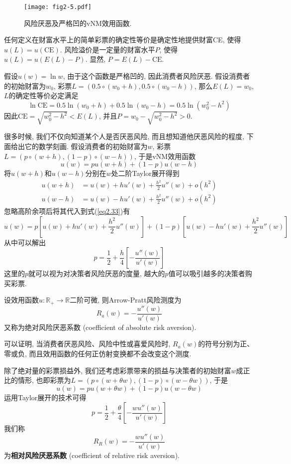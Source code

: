 \documentclass[cn, 12pt, math=mtpro2, bibstyle=apa, blue]{elegantbook}
\newcommand{\R}{\mathbb{R}}
\begin{document}
\begin{figure}[htbp!]
  \centering
  \texttt{[image: fig2-5.pdf]}
  \caption{风险厌恶及严格凹的vNM效用函数.}\label{fig2.5}
\end{figure}

\begin{definition}[确定性等价与风险溢价]
任何定义在财富水平上的简单彩票的确定性等价是确定性地提供财富CE, 使得$u(L)=u(\text{CE})$. 风险溢价是一定量的财富水平$P$, 使得$u(L)=u(E(L)-P)$. 显然, $P=E(L)-\text{CE}$.
\end{definition}

\begin{example}
假设$u(w)=\ln w$, 由于这个函数是严格凹的, 因此消费者风险厌恶. 假设消费者的初始财富为$w_0$, 彩票$L=(0.5\circ (w_0+h), 0.5\circ (w_0-h))$, 那么$E(L)=w_0$, $L$的确定性等价必定满足
$$\ln \text{CE}=0.5\ln (w_0+h)+0.5\ln (w_0-h)=0.5\ln (w_0^2-h^2)$$
因此$\text{CE}=\sqrt{w_0^2-h^2}<E(L)$, 并且$P=w_0-\sqrt{w_0^2-h^2}>0$.
\end{example}

很多时候, 我们不仅向知道某个人是否厌恶风险, 而且想知道他厌恶风险的程度, 下面给出它的数学刻画. 假设消费者的初始财富为$w$, 彩票$L=(p\circ (w+h), (1-p)\circ (w-h))$, 于是vNM效用函数
\begin{equation}\label{eq2.33}
  u(w)=pu(w+h)+(1-p)u(w-h)
\end{equation}
将$u(w+h)$和$u(w-h)$分别在$w$处二阶Taylor展开得到
\begin{align*}
u(w+h)&=u(w)+hu'(w)+\frac{h^2}{2}u''(w)+o(h^2) \\
u(w-h)&=u(w)-hu'(w)+\frac{h^2}{2}u''(w)+o(h^2)
\end{align*}
忽略高阶余项后将其代入到式(\ref{eq2.33})有
$$u(w)=p\left[u(w)+hu'(w)+\frac{h^2}{2}u''(w)\right]+(1-p)\left[u(w)-hu'(w)+\frac{h^2}{2}u''(w)\right]$$
从中可以解出
$$p=\frac{1}{2}+\frac{h}{4}\left[-\frac{u''(w)}{u'(w)}\right]$$
这里的$p$就可以视为对决策者风险厌恶的度量, 越大的$p$值可以吸引越多的决策者购买彩票.
\begin{definition}
设效用函数$u:\R_+\to \R$二阶可微, 则Arrow-Pratt风险测度为
$$R_a(w)=-\frac{u''(w)}{u'(w)}$$
又称为绝对风险厌恶系数 (coefficient of absolute risk aversion).
\end{definition}
可以证明, 当消费者厌恶风险、风险中性或喜爱风险时, $R_a(w)$的符号分别为正、零或负, 而且效用函数的任何正仿射变换都不会改变这个测度.

除了绝对量的彩票损益外, 我们还考虑彩票带来的损益与决策者的初始财富$w$成正比的情形, 也即彩票为$L=(p\circ (w+\theta w),(1-p)\circ (w-\theta w))$, 于是
$$u(w)=pu(w+\theta w)+(1-p)u(w-\theta w)$$
运用Taylor展开的技术可得
$$p=\frac{1}{2}+\frac{\theta}{4}\left[-\frac{wu''(w)}{u'(w)}\right]$$
我们称
$$R_R(w)=-\frac{wu''(w)}{u'(w)}$$
为\textbf{相对风险厌恶系数} (coefficient of relative risk aversion).
\end{document}
